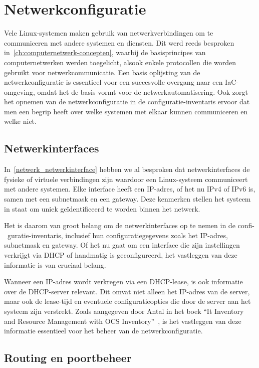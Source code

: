 \section{Netwerkconfiguratie}
\label{risico_netwerkconfiguratie}

Vele Linux-systemen maken gebruik van netwerkverbindingen om te communiceren met andere systemen en diensten.
Dit werd reeds besproken in~\ref{ch:computernetwerk-concepten}, waarbij de basisprincipes van computernetwerken werden toegelicht, alsook enkele protocollen die worden gebruikt voor netwerkcommunicatie.
Een basis oplijsting van de netwerkconfiguratie is essentieel voor een succesvolle overgang naar een IaC-omgeving, omdat het de basis vormt voor de netwerkautomatisering.
Ook zorgt het opnemen van de netwerkconfiguratie in de configuratie-inventaris ervoor dat men een begrip heeft over welke systemen met elkaar kunnen communiceren en welke niet.

\subsection{Netwerkinterfaces}
\label{risico_netwerkinterfaces}

In~\ref{netwerk_netwerkinterface} hebben we al besproken dat netwerkinterfaces de fysieke of virtuele verbindingen zijn waardoor een Linux-systeem communiceert met andere systemen.
Elke interface heeft een IP-adres, of het nu IPv4 of IPv6 is, samen met een subnetmask en een gateway.
Deze kenmerken stellen het systeem in staat om uniek ge\"identificeerd te worden binnen het netwerk.

Het is daarom van groot belang om de netwerkinterfaces op te nemen in de confi-\ guratie-inventaris, inclusief hun configuratiegegevens zoals het IP-adres, subnetmask en gateway.
Of het nu gaat om een interface die zijn instellingen verkrijgt via DHCP of handmatig is geconfigureerd, het vastleggen van deze informatie is van cruciaal belang.

Wanneer een IP-adres wordt verkregen via een DHCP-lease, is ook informatie over de DHCP-server relevant.
Dit omvat niet alleen het IP-adres van de server, maar ook de lease-tijd en eventuele configuratieopties die door de server aan het systeem zijn verstrekt.
Zoals aangegeven door Antal in het boek ``It Inventory and Resource Management with OCS Inventory''~\autocite{Antal2010}, is het vastleggen van deze informatie essentieel voor het beheer van de netwerkconfiguratie.

\subsection{Routing en poortbeheer}
\label{risico_routing_poorten}

